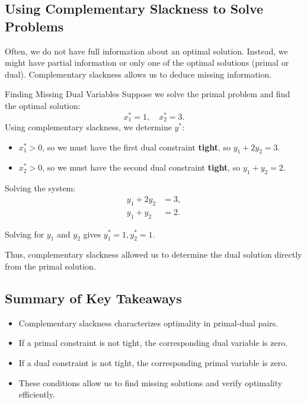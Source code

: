 \subsection{Using Complementary Slackness to Solve Problems}
\label{sec:cs-solving}
Often, we do not have full information about an optimal solution. Instead, we might have partial information or only one of the optimal solutions (primal or dual). Complementary slackness allows us to deduce missing information.

\begin{example}{Finding Missing Dual Variables}\label{example:cs-missing-duals}
Suppose we solve the primal problem and find the optimal solution:
\[
x_1^* = 1, \quad x_2^* = 3.
\]
Using complementary slackness, we determine $y^*$:
\begin{itemize}
\item $x_1^* > 0$, so we must have the first dual constraint \textbf{tight}, so $y_1 + 2y_2 = 3$.
\item $x_2^* > 0$, so we must have the second dual constraint \textbf{tight}, so $ y_1 + y_2 = 2$.
\end{itemize}

Solving the system:
\begin{align*}
   y_1 + 2y_2 &= 3, \\
   y_1 + y_2 &= 2.
\end{align*}

Solving for $y_1$ and $y_2$ gives $y_1^* = 1, y_2^* = 1$.

Thus, complementary slackness allowed us to determine the dual solution directly from the primal solution.
\end{example}

\subsection{Summary of Key Takeaways}
\begin{itemize}
\item Complementary slackness characterizes optimality in primal-dual pairs.
\item If a primal constraint is not tight, the corresponding dual variable is zero.
\item If a dual constraint is not tight, the corresponding primal variable is zero.
\item These conditions allow us to find missing solutions and verify optimality efficiently.
\end{itemize}

